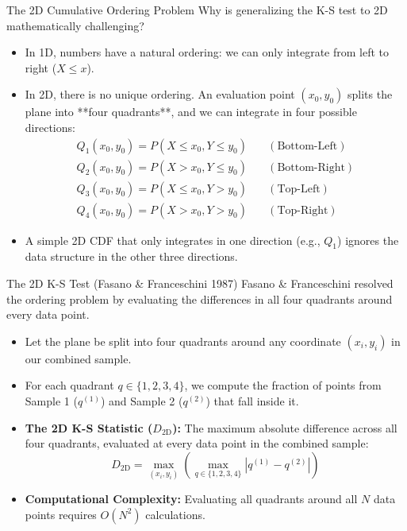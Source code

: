 \documentclass[9pt]{beamer}
\begin{document}
\begin{frame}{The 2D Cumulative Ordering Problem}
  Why is generalizing the K-S test to 2D mathematically challenging?
  \begin{itemize}
    \item In 1D, numbers have a natural ordering: we can only integrate from left to right ($X \le x$).
    \item In 2D, there is no unique ordering. An evaluation point $(x_0, y_0)$ splits the plane into **four quadrants**, and we can integrate in four possible directions:
      \begin{align*}
        Q_1(x_0, y_0) = P(X \le x_0, Y \le y_0) & \quad (\text{Bottom-Left}) \\
        Q_2(x_0, y_0) = P(X > x_0, Y \le y_0) & \quad (\text{Bottom-Right}) \\
        Q_3(x_0, y_0) = P(X \le x_0, Y > y_0) & \quad (\text{Top-Left}) \\
        Q_4(x_0, y_0) = P(X > x_0, Y > y_0) & \quad (\text{Top-Right})
      \end{align*}
    \item A simple 2D CDF that only integrates in one direction (e.g., $Q_1$) ignores the data structure in the other three directions.
  \end{itemize}
\end{frame}

\begin{frame}{The 2D K-S Test (Fasano \& Franceschini 1987)}
  Fasano \& Franceschini resolved the ordering problem by evaluating the differences in all four quadrants around every data point.
  \begin{itemize}
    \item Let the plane be split into four quadrants around any coordinate $(x_i, y_i)$ in our combined sample.
    \item For each quadrant $q \in \{1, 2, 3, 4\}$, we compute the fraction of points from Sample 1 ($q^{(1)}$) and Sample 2 ($q^{(2)}$) that fall inside it.
    \item \textbf{The 2D K-S Statistic ($D_{2\text{D}}$):} The maximum absolute difference across all four quadrants, evaluated at every data point in the combined sample:
      $$D_{2\text{D}} = \max_{(x_i, y_i)} \left( \max_{q \in \{1,2,3,4\}} |q^{(1)} - q^{(2)}| \right)$$
    \item \textbf{Computational Complexity:} Evaluating all quadrants around all $N$ data points requires $O(N^2)$ calculations.
  \end{itemize}
\end{frame}
\end{document}
